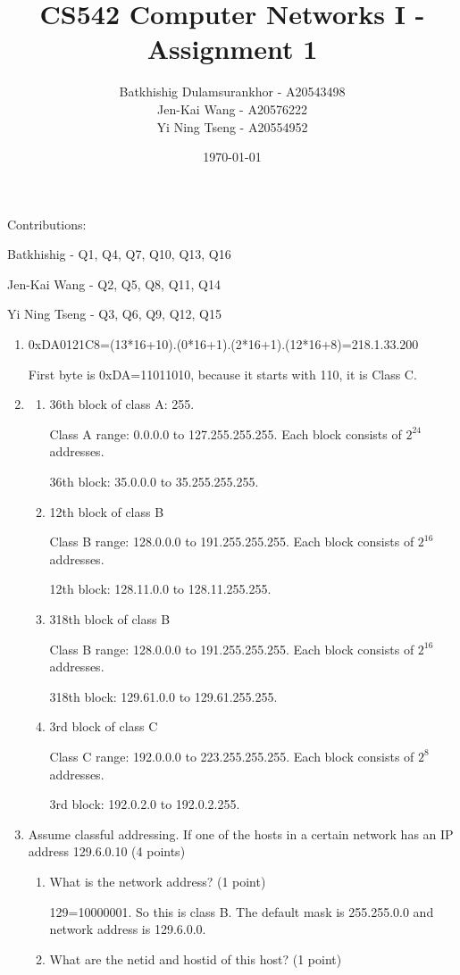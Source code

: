 \documentclass{article}
\title{CS542 Computer Networks I - Assignment 1}
\author{
  Batkhishig Dulamsurankhor - A20543498 \\
  Jen-Kai	Wang - A20576222 \\
  Yi Ning	Tseng - A20554952 \\
}
\date{\today} %
\begin{document}
\maketitle

Contributions:

Batkhishig - Q1, Q4, Q7, Q10, Q13, Q16

Jen-Kai	Wang - Q2, Q5, Q8, Q11, Q14

Yi Ning	Tseng - Q3, Q6, Q9, Q12, Q15

\begin{enumerate}
  \item 0xDA0121C8=(13*16+10).(0*16+1).(2*16+1).(12*16+8)=218.1.33.200

  First byte is 0xDA=11011010, because it starts with 110, it is Class C.
  \item
    \begin{enumerate}
      \item 36th block of class A: 255.

      Class A range: 0.0.0.0 to 127.255.255.255. Each block consists of $2^{24}$ addresses.

      36th block: 35.0.0.0 to 35.255.255.255.

      \item 12th block of class B

      Class B range: 128.0.0.0 to 191.255.255.255. Each block consists of $2^{16}$ addresses.

      12th block: 128.11.0.0 to 128.11.255.255.
      \item 318th block of class B

      Class B range: 128.0.0.0 to 191.255.255.255. Each block consists of $2^{16}$ addresses.

      318th block: 129.61.0.0 to 129.61.255.255.
      \item 3rd block of class C

      Class C range: 192.0.0.0 to 223.255.255.255. Each block consists of $2^{8}$ addresses.

      3rd block: 192.0.2.0 to 192.0.2.255.
    \end{enumerate}
  \item Assume classful addressing. If one of the hosts in a certain network has an IP address 129.6.0.10 (4 points)
  \begin{enumerate}
    \item What is the network address? (1 point)
    
    129=10000001. So this is class B. The default mask is 255.255.0.0 and network address is 129.6.0.0.
    \item What are the netid and hostid of this host? (1 point)
    

\end{enumerate}
\end{enumerate}
\end{document}
